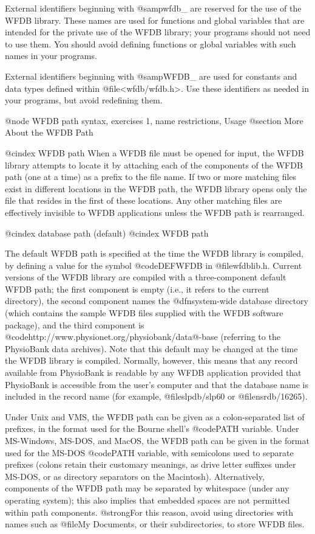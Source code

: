 {{External identifiers beginning with @samp{wfdb_} are reserved for the use
of the WFDB library.  These names are used for functions and global variables
that are intended for the private use of the WFDB library; your programs
should not need to use them.  You should avoid defining functions or
global variables with such names in your programs.

External identifiers beginning with @samp{WFDB_} are used for constants
and data types defined within @file{<wfdb/wfdb.h>}.  Use these identifiers
as needed in your programs, but avoid redefining them.

@node     WFDB path syntax, exercises 1, name restrictions, Usage
@section More About the WFDB Path

@cindex WFDB path
When a WFDB file must be opened for input, the WFDB library attempts to
locate it by attaching each of the components of the WFDB path (one at a
time) as a prefix to the file name.  If two or more matching files exist
in different locations in the WFDB path, the WFDB library opens only the
file that resides in the first of these locations.  Any other matching
files are effectively invisible to WFDB applications unless the WFDB
path is rearranged.

@cindex database path (default)
@cindex WFDB path

The default WFDB path is specified at the time the WFDB library is
compiled, by defining a value for the symbol @code{DEFWFDB} in
@file{wfdblib.h}.  Current versions of the WFDB library are compiled
with a three-component default WFDB path; the first component is empty
(i.e., it refers to the current directory), the second component names
the @dfn{system-wide database directory} (which contains the sample WFDB
files supplied with the WFDB software package), and the third component
is @code{http://www.physionet.org/physiobank/data@-base} (referring to the
PhysioBank data archives).  Note that this default may be changed at the
time the WFDB library is compiled.  Normally, however, this means that
any record available from PhysioBank is readable by any WFDB application
provided that PhysioBank is accessible from the user's computer and that
the database name is included in the record name (for example,
@file{slpdb/slp60} or @file{nsrdb/16265}).

Under Unix and VMS, the WFDB path can be given as a colon-separated list
of prefixes, in the format used for the Bourne shell's @code{PATH}
variable.  Under MS-Windows, MS-DOS, and MacOS, the WFDB path can be
given in the format used for the MS-DOS @code{PATH} variable, with
semicolons used to separate prefixes (colons retain their customary
meanings, as drive letter suffixes under MS-DOS, or as directory
separators on the Macintosh).  Alternatively, components of the WFDB
path may be separated by whitespace (under any operating system); this
also implies that embedded spaces are not permitted within path
components.  @strong{For this reason, avoid using directories with names
such as @file{My Documents}, or their subdirectories, to store WFDB files.}

}}
